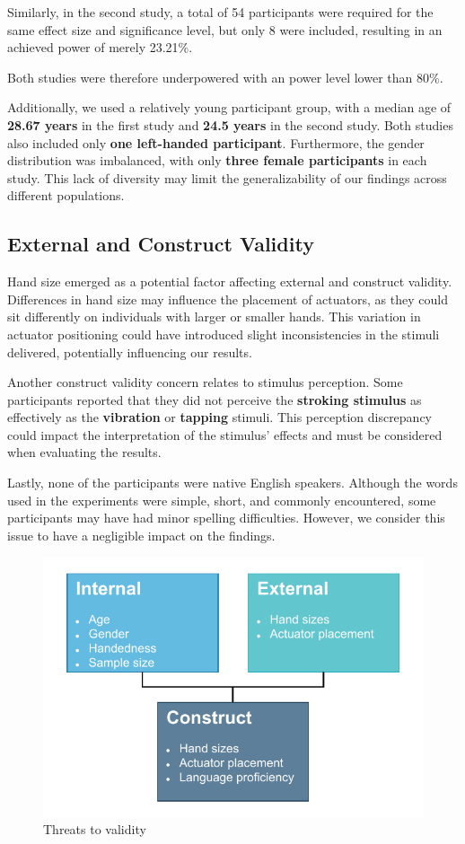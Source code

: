 Similarly, in the second study, a total of 54 participants were required for the same effect size and significance level, but only 8 were included, resulting in an achieved power of merely 23.21\%. 

Both studies were therefore underpowered with an power level lower than 80\%.


Additionally, we used a relatively young participant group, with a median age of \textbf{28.67 years} in the first study and \textbf{24.5 years} in the second study. Both studies also included only \textbf{one left-handed participant}. Furthermore, the gender distribution was imbalanced, with only \textbf{three female participants} in each study. This lack of diversity may limit the generalizability of our findings across different populations.

\subsection{External and Construct Validity}
Hand size emerged as a potential factor affecting external and construct validity. Differences in hand size may influence the placement of actuators, as they could sit differently on individuals with larger or smaller hands. This variation in actuator positioning could have introduced slight inconsistencies in the stimuli delivered, potentially influencing our results.

Another construct validity concern relates to stimulus perception. Some participants reported that they did not perceive the \textbf{stroking stimulus} as effectively as the \textbf{vibration} or \textbf{tapping} stimuli. This perception discrepancy could impact the interpretation of the stimulus' effects and must be considered when evaluating the results.

Lastly, none of the participants were native English speakers. Although the words used in the experiments were simple, short, and commonly encountered, some participants may have had minor spelling difficulties. However, we consider this issue to have a negligible impact on the findings.

\begin{figure}
    \centering
    \includegraphics[width=0.5\linewidth]{src/pictures/StudyData/Threats_to_validity.drawio.pdf}
    \caption{Threats to validity}
    \label{fig:threats_to_validity}
\end{figure}


